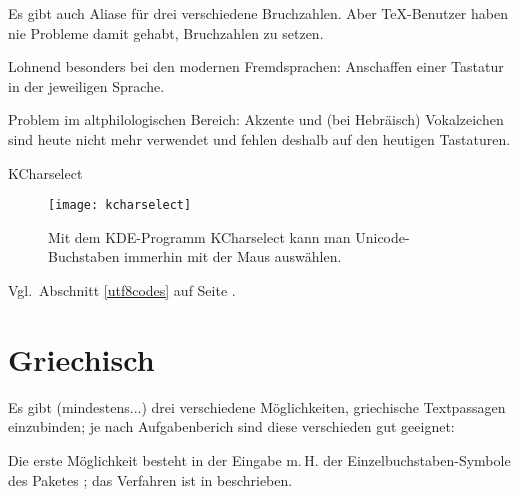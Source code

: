Es gibt auch Aliase für drei verschiedene Bruchzahlen. Aber
\TeX{}-Benutzer haben nie Probleme damit gehabt, Bruchzahlen
zu setzen.




Lohnend besonders bei den modernen Fremdsprachen: Anschaffen einer Tastatur in der jeweiligen
Sprache.

Problem im altphilologischen Bereich: Akzente und (bei Hebräisch) Vokalzeichen sind heute
nicht mehr verwendet und fehlen deshalb auf den heutigen Tastaturen.

KCharselect

\begin{figure}
 \texttt{[image: kcharselect]}
 \caption{Mit dem KDE-Programm KCharselect kann man Unicode-Buchstaben immerhin mit der Maus
 auswählen.}
\end{figure}


Vgl.\ Abschnitt \ref{utf8codes} auf Seite \pageref{utf8codes}.

\section{Griechisch}

Es gibt (mindestens...) drei verschiedene Möglichkeiten, griechische Textpassagen einzubinden;
je nach Aufgabenberich sind diese verschieden gut geeignet:



Die erste Möglichkeit besteht in der Eingabe m.\,H. der Einzelbuchstaben-Symbole des Paketes
; das Verfahren ist in   beschrieben.

